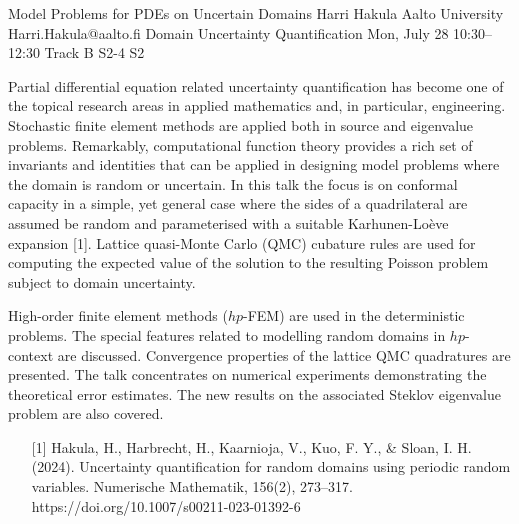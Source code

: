\begin{talk}
  {Model Problems for PDEs on Uncertain Domains}%
  {Harri Hakula}%
  {Aalto University}%
  {Harri.Hakula@aalto.fi}%
  {Domain Uncertainty Quantification}%
  {}%
  {Mon, July 28 10:30–12:30 Track B}%
  {S2-4}%
  {S2}%
				
			
Partial differential equation related uncertainty quantification has become one of the
topical research areas in applied mathematics and, in particular, engineering.
Stochastic finite element methods are applied both in source and eigenvalue problems.
Remarkably, computational function theory provides a rich set of invariants 
and identities that
can be applied in designing model problems where the domain is random or uncertain. 
In this talk the focus is on conformal capacity in a simple, 
yet general case where the sides of a quadrilateral are assumed be random 
and parameterised with a suitable Karhunen-Loève expansion [1].
Lattice quasi-Monte Carlo (QMC) cubature rules are used for computing the expected value of the solution to the resulting Poisson problem subject to domain uncertainty. 

High-order finite element methods ($hp$-FEM) are used in the deterministic problems.
The special features related to modelling random domains in $hp$-context are discussed.
Convergence properties of the lattice QMC quadratures are presented. The talk
concentrates on numerical experiments demonstrating the theoretical error estimates.
The new results on the associated Steklov eigenvalue problem are also covered.


\medskip

\begin{enumerate}
	\item[{[1]}] Hakula, H., Harbrecht, H., Kaarnioja, V., Kuo, F. Y., \& Sloan, I. H. (2024). Uncertainty quantification for random domains using periodic random variables. Numerische Mathematik, 156(2), 273–317. https://doi.org/10.1007/s00211-023-01392-6
\end{enumerate}

\end{talk}

